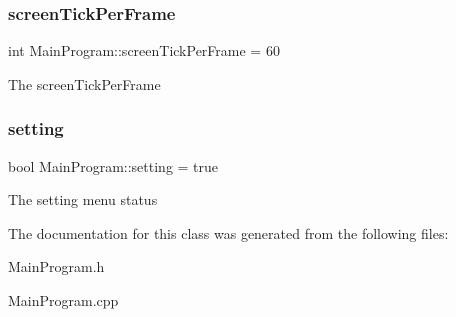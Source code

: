 \subsubsection{\texorpdfstring{screen\+Tick\+Per\+Frame}{screenTickPerFrame}}
{\footnotesize\ttfamily int Main\+Program\+::screen\+Tick\+Per\+Frame = 60\hspace{0.3cm}{\ttfamily [private]}}

The screen\+Tick\+Per\+Frame \mbox{\label{class_main_program_ae32c52912be971caaadf9a0b5d2c31cf}} 
\subsubsection{\texorpdfstring{setting}{setting}}
{\footnotesize\ttfamily bool Main\+Program\+::setting = true\hspace{0.3cm}{\ttfamily [private]}}

The setting menu status 

The documentation for this class was generated from the following files\+:\begin{DoxyCompactItemize}
\item 
Main\+Program.\+h\item 
Main\+Program.\+cpp\end{DoxyCompactItemize}
